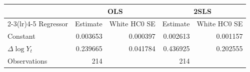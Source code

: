 \begin{tabular}{lrrrr}
\toprule
 & \multicolumn{2}{c}{OLS} & \multicolumn{2}{c}{2SLS} \\
\cmidrule(lr){2-3}\cmidrule(lr){4-5}
Regressor & Estimate & White HC0 SE & Estimate & White HC0 SE \\
\midrule
Constant & 0.003653 & 0.000397 & 0.002613 & 0.001157 \\
$\Delta\log Y_t$ & 0.239665 & 0.041784 & 0.436925 & 0.202555 \\
\midrule
Observations & 214 & & 214 & \\
\bottomrule
\end{tabular}
